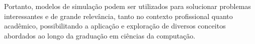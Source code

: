 \documentclass[pt,disc,oneside]{ufscpgeasthesis}
\begin{document}
		Portanto, modelos de simulação podem ser utilizados para solucionar problemas interessantes e de grande relevância, tanto no contexto profissional quanto acadêmico, possibilitando a aplicação e exploração de diversos conceitos abordados ao longo da graduação em ciências da computação.

	\backmatter
	\appendix

	
	
\end{document}
